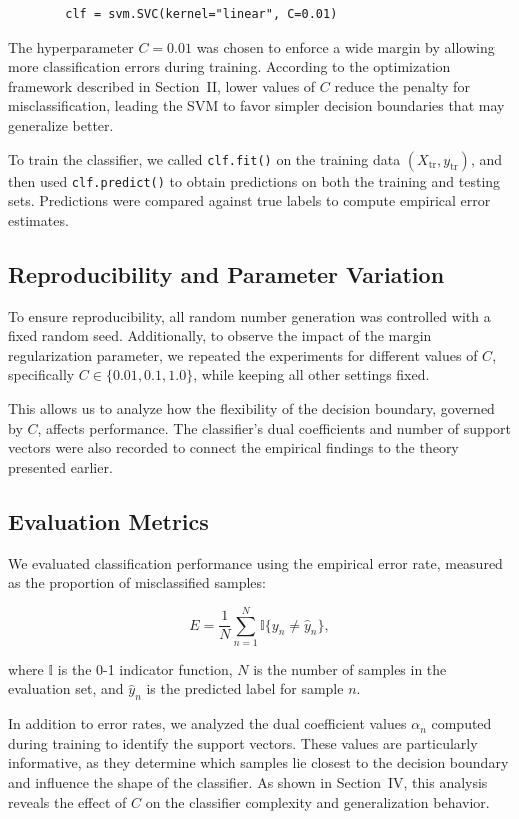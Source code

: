 \documentclass[conference]{IEEEtran}
\begin{document}
	\begin{verbatim}
		clf = svm.SVC(kernel="linear", C=0.01)
	\end{verbatim}
	
	The hyperparameter $C = 0.01$ was chosen to enforce a wide margin by allowing more classification errors during training. According to the optimization framework described in Section~II, lower values of $C$ reduce the penalty for misclassification, leading the SVM to favor simpler decision boundaries that may generalize better.
	
	To train the classifier, we called \texttt{clf.fit()} on the training data $(X_{\text{tr}}, y_{\text{tr}})$, and then used \texttt{clf.predict()} to obtain predictions on both the training and testing sets. Predictions were compared against true labels to compute empirical error estimates.
	
	\subsection{Reproducibility and Parameter Variation}
	
	To ensure reproducibility, all random number generation was controlled with a fixed random seed. Additionally, to observe the impact of the margin regularization parameter, we repeated the experiments for different values of $C$, specifically $C \in \{0.01, 0.1, 1.0\}$, while keeping all other settings fixed.
	
	This allows us to analyze how the flexibility of the decision boundary, governed by $C$, affects performance. The classifier’s dual coefficients and number of support vectors were also recorded to connect the empirical findings to the theory presented earlier.
	
	\subsection{Evaluation Metrics}
	
	We evaluated classification performance using the empirical error rate, measured as the proportion of misclassified samples:
	
	\[
	E = \frac{1}{N} \sum_{n=1}^{N} \mathbb{I}\{y_n \neq \hat{y}_n\},
	\]
	
	where $\mathbb{I}$ is the 0-1 indicator function, $N$ is the number of samples in the evaluation set, and $\hat{y}_n$ is the predicted label for sample $n$.
	
	In addition to error rates, we analyzed the dual coefficient values $\alpha_n$ computed during training to identify the support vectors. These values are particularly informative, as they determine which samples lie closest to the decision boundary and influence the shape of the classifier. As shown in Section~IV, this analysis reveals the effect of $C$ on the classifier complexity and generalization behavior.
\end{document}
